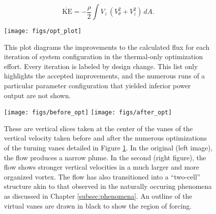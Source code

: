  \begin{equation}
  \dot{ \text{KE}} = -\frac{\rho }{2} \int V_z \, (V_{\theta}^2 + V_z^2 ) \, dA.
 \end{equation}

\begin{figure}[htb]
 \centering
 \texttt{[image: figs/opt\_plot]}
 \caption{This plot diagrams the improvements to the calculated flux for  
 each iteration of system configuration in the thermal-only optimization
 effort. Every iteration is labeled by design change. This list
 only highlights the accepted improvements, and the numerous runs of a
 particular parameter configuration that yielded inferior power output
 are not shown. }
 \label{fig:opt_plot}
\end{figure}






\begin{figure}[htb]
  \centering
 \texttt{[image: figs/before\_opt]}
 \hfill
 \texttt{[image: figs/after\_opt]} \\
  \caption{These are vertical slices taken at the center of the vanes of
 the vertical velocity taken before and after the numerous optimizations
 of the turning vanes detailed in Figure \ref{fig:opt_plot}. In the
 original (left image), the flow produces a narrow plume. In the second
 (right figure), the flow shows stronger vertical velocities in a much
 larger and more organized vortex. The flow has also transitioned into a
 ``two-cell'' structure akin to that observed in the naturally occuring
 phenomena as discussed in Chapter \ref{subsec:phenomena}. An outline of
 the virtual vanes are drawn in black to show the region of forcing.}
  \label{fig:opt_flow}
\end{figure}

